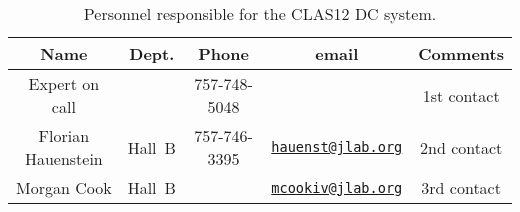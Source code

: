 \begin{table}[!htb]
\centering
\begin{tabular}{|c|c|c|c|c|} \hline
Name               & Dept.  & Phone        & email&Comments \\ \hline
Expert on call     &        & 757-748-5048 &       & 1st contact \\ \hline
Florian Hauenstein & Hall~B & 757-746-3395 & \href{mailto:hauenst@jlab.org}{\nolinkurl{hauenst@jlab.org}} &  2nd contact\\ \hline
Morgan Cook        & Hall~B &              & \href{mailto:mcookiv@jlab.org}{\nolinkurl{mcookiv@jlab.org}} & 3rd contact\\ \hline

 \end{tabular}
\caption{Personnel responsible for the CLAS12 DC system.} 
\label{tb:dc}
\end{table}



